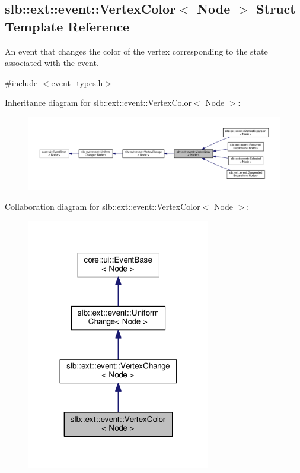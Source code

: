 \hypertarget{structslb_1_1ext_1_1event_1_1VertexColor}{}\subsection{slb\+:\+:ext\+:\+:event\+:\+:Vertex\+Color$<$ Node $>$ Struct Template Reference}
\label{structslb_1_1ext_1_1event_1_1VertexColor}


An event that changes the color of the vertex corresponding to the state associated with the event.  




{\ttfamily \#include $<$event\+\_\+types.\+h$>$}



Inheritance diagram for slb\+:\+:ext\+:\+:event\+:\+:Vertex\+Color$<$ Node $>$\+:\nopagebreak
\begin{figure}[H]
\begin{center}
\leavevmode
\includegraphics[width=350pt]{structslb_1_1ext_1_1event_1_1VertexColor__inherit__graph}
\end{center}
\end{figure}


Collaboration diagram for slb\+:\+:ext\+:\+:event\+:\+:Vertex\+Color$<$ Node $>$\+:\nopagebreak
\begin{figure}[H]
\begin{center}
\leavevmode
\includegraphics[width=227pt]{structslb_1_1ext_1_1event_1_1VertexColor__coll__graph}
\end{center}
\end{figure}
